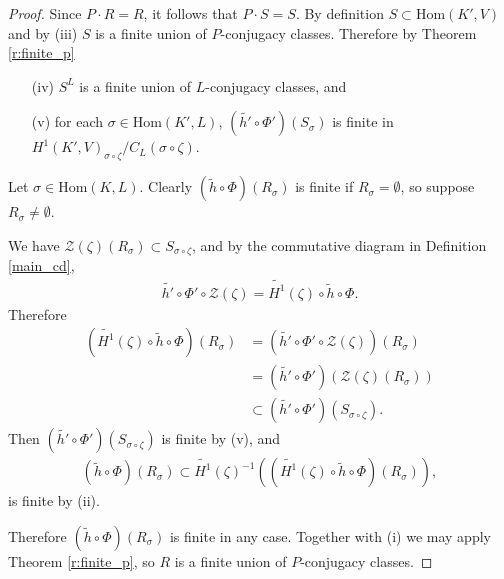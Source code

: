 \begin{proof}
Since $P \cdot R = R$, it follows that $P\cdot S = S$. By definition $S \subset \mathrm{Hom}(K', V)$ and by (iii) $S$ is a finite union of $P$-conjugacy classes. Therefore by Theorem \ref{r:finite_p}
\begin{itemize}
	\item[(iv)] $S^L$ is a finite union of $L$-conjugacy classes, and
	\item[(v)] for each $\sigma \in \mathrm{Hom}(K', L)$, $(\widetilde{h'} \circ \Phi')\left(S_\sigma\right)$ is finite in $H^1(K', V)_{\sigma\circ\zeta}/C_L(\sigma\circ\zeta)$.
\end{itemize}

Let $\sigma \in \mathrm{Hom}(K, L)$. Clearly $(\widetilde{h} \circ \Phi)\left(R_\sigma\right)$ is finite if $R_\sigma = \emptyset$, so suppose $R_\sigma \neq \emptyset$. 

We have $\mathcal{Z}(\zeta)(R_\sigma) \subset S_{\sigma\circ\zeta}$, and by the commutative diagram in Definition \ref{main_cd},
\begin{align*}
	\widetilde{h'} \circ \Phi' \circ \mathcal{Z}(\zeta) = \widetilde{H^1}(\zeta) \circ \widetilde{h} \circ \Phi.
\end{align*}
Therefore
\begin{align*}
	\left(\widetilde{H^1}(\zeta) \circ \widetilde{h} \circ \Phi\right)(R_\sigma) &= \left(\widetilde{h'} \circ \Phi' \circ \mathcal{Z}(\zeta)\right)(R_\sigma) \\
		&= (\widetilde{h'} \circ \Phi')\left(\mathcal{Z}(\zeta)(R_\sigma)\right) \\
		&\subset (\widetilde{h'} \circ \Phi')(S_{\sigma\circ\zeta}).
\end{align*}
Then $\left(\widetilde{h'} \circ \Phi'\right)(S_{\sigma\circ\zeta})$ is finite by (v), and
\begin{align*}
	(\widetilde{h} \circ \Phi)(R_\sigma) \subset \widetilde{H^1}(\zeta)^{-1} \left(\left(\widetilde{H^1}(\zeta) \circ \widetilde{h} \circ \Phi\right)(R_\sigma)\right),
\end{align*}
is finite by (ii).

Therefore $(\widetilde{h} \circ \Phi)(R_\sigma)$ is finite in any case. Together with (i) we may apply Theorem \ref{r:finite_p}, so $R$ is a finite union of $P$-conjugacy classes.
\end{proof}


